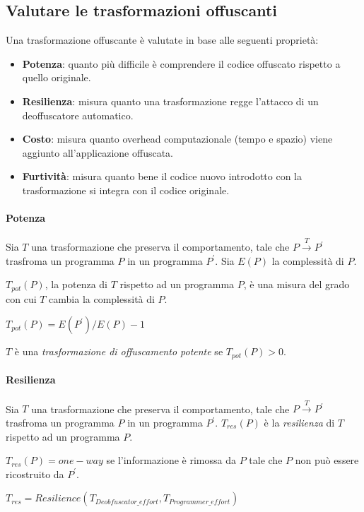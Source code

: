 \documentclass[a4paper,oneside,openright,titlepage,10pt,footinclude,headinclude]{scrbook}
\begin{document}
\subsection{Valutare le trasformazioni offuscanti}
Una trasformazione offuscante è valutate in base alle seguenti proprietà:
\begin{itemize}
\item
\textbf{Potenza}: quanto più difficile è comprendere il codice offuscato rispetto a quello originale.
\item
\textbf{Resilienza}: misura quanto una trasformazione regge l'attacco di un deoffuscatore automatico.
\item
\textbf{Costo}: misura quanto overhead computazionale (tempo e spazio) viene aggiunto all'applicazione offuscata.
\item
\textbf{Furtività}: misura quanto bene il codice nuovo introdotto con la trasformazione si integra con il codice originale.
\end{itemize}

\paragraph{Potenza} 
Sia $T$ una trasformazione che preserva il comportamento, tale che $P \xrightarrow{T} P^{'}$ trasfroma un programma $P$ in un programma $P^{'}$. Sia $E(P)$ la complessità di $P$.\smallskip


$T_{pot}(P)$, la potenza di $T$ rispetto ad un programma $P$, è una  misura del grado con cui $T$ cambia la complessità di $P$.

\begin{center}
$T_{pot}(P) = E(P^{'}) / E(P) - 1$
\end{center}
 
 $T$ è una \emph{trasformazione di offuscamento potente} se $T_{pot}(P) > 0$.
 
 \paragraph{Resilienza} 
Sia $T$ una trasformazione che preserva il comportamento, tale che $P \xrightarrow{T} P^{'}$ trasfroma un programma $P$ in un programma $P^{'}$.  $T_{res}(P)$ è la \emph{resilienza} di $T$ rispetto ad un programma $P$. \smallskip

 $T_{res}(P) = one-way$ se l'informazione è rimossa da $P$ tale che $P$ non può essere ricostruito da $P^{'}$. \smallskip

\begin{center}
$T_{res} = Resilience(T_{Deobfuscator\_effort}, T_{Programmer\_effort})$ 
\end{center}
\end{document}
